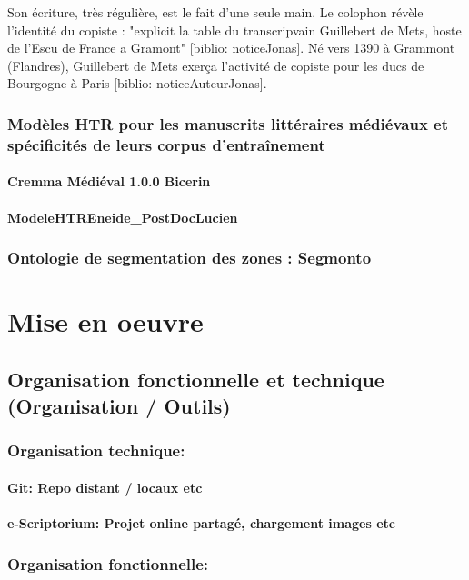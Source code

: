 \documentclass{article}
\begin{document}
Son écriture, très régulière, est le fait d'une seule main. Le colophon révèle l'identité du copiste : "explicit la table du transcripvain Guillebert de Mets, hoste de l'Escu de France a Gramont" [biblio: noticeJonas]. Né vers 1390 à Grammont (Flandres), Guillebert de Mets exerça l'activité de copiste pour les ducs de Bourgogne à Paris [biblio: noticeAuteurJonas]. 
    
    \subsubsection{Modèles HTR pour les manuscrits littéraires médiévaux et spécificités de leurs corpus d'entraînement}
      \paragraph{Cremma Médiéval 1.0.0 Bicerin}
      \paragraph{ModeleHTREneide_PostDocLucien}
    \subsubsection{Ontologie de segmentation des zones : Segmonto}

\section{Mise en oeuvre}

  \subsection{Organisation fonctionnelle et technique (Organisation / Outils)}
    \subsubsection{Organisation technique:}
      \paragraph{Git: Repo distant / locaux etc}
      \paragraph{e-Scriptorium: Projet online partagé, chargement images etc}
    \subsubsection{Organisation fonctionnelle:}
\end{document}
